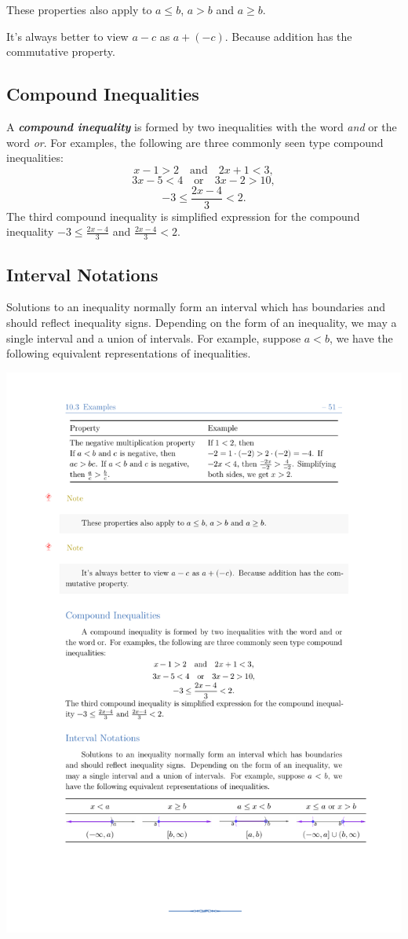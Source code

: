 \documentclass[en,11pt]{elegantbook}
\newcommand{\size}[2]{{\fontsize{#1}{0}\selectfont#2}}
\newenvironment{rmdnote}{
	\vspace*{0.5\baselineskip}
    \par\noindent
    \makebox[-3pt][r]{\color{red!90}\size{8}{\textdbend}\,\,}
    \begin{tcolorbox}[
    title={\textbf{\color{second}Note}},
    title style={left color=blue!10!green!20!white,right color=yellow!20!blue!20!white},
    colback=red!10!white,
    ]
    \itshape
}{
    \end{tcolorbox}
    \par\ignorespacesafterend
}
\begin{document}
\begin{rmdnote}

These properties also apply to \(a\leq b\), \(a>b\) and \(a\geq b\).

It's always better to view \(a-c\) as \(a+(-c)\). Because addition has the commutative property.

\end{rmdnote}

\hypertarget{compound-inequalities}{%
\subsection*{Compound Inequalities}\label{compound-inequalities}}

A \textbf{\emph{compound inequality}} is formed by two inequalities with the word \emph{and} or the word \emph{or}. For examples, the following are three commonly seen type compound inequalities:
\[
x-1>2\quad \text{and} \quad 2x+1<3,
\]
\[
3x-5<4\quad \text{or} \quad 3x-2>10,
\]
\[
-3\leq \frac{2x-4}{3}<2.
\]
The third compound inequality is simplified expression for the compound inequality \(-3\leq \frac{2x-4}{3}\) and \(\frac{2x-4}{3}<2\).

\hypertarget{interval-notations}{%
\subsection*{Interval Notations}\label{interval-notations}}

Solutions to an inequality normally form an interval which has boundaries and should reflect inequality signs. Depending on the form of an inequality, we may a single interval and a union of intervals. For example, suppose \(a<b\), we have the following equivalent representations of inequalities.

\begin{center}\includegraphics[width=0.5\linewidth]{figs/linear-inequalities} \end{center}
\end{document}
